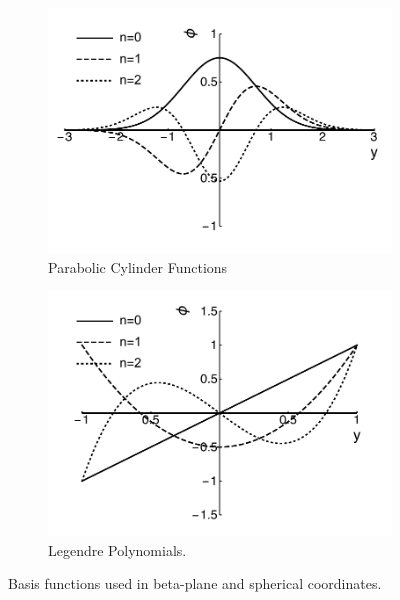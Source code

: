 \begin{figure}
  \centering
  \begin{subfigure}[b]{0.4\textwidth}
    \includegraphics[width=\textwidth]{figures/appendices/hermite-functions.pdf}
    \caption{Parabolic Cylinder Functions}\label{fig:hermite-functions}
  \end{subfigure}
  \begin{subfigure}[b]{0.4\textwidth}
    \includegraphics[width=\textwidth]{figures/appendices/legendre-polynomials.pdf}
    \caption{Legendre Polynomials.}\label{fig:legendre-polynomials}
  \end{subfigure}
\caption{Basis functions used in beta-plane and spherical coordinates.}\label{fig:basis-functions}
\end{figure}

